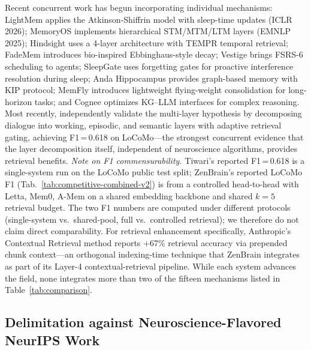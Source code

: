 \documentclass{article}
\begin{document}
Recent concurrent work has begun incorporating individual mechanisms:
LightMem \citep{liu2025lightmem} applies the Atkinson-Shiffrin model with
sleep-time updates (ICLR 2026);
MemoryOS \citep{xu2025memoryos} implements hierarchical STM/MTM/LTM layers
(EMNLP 2025);
Hindsight \citep{li2025hindsight} uses a 4-layer architecture with
TEMPR temporal retrieval;
FadeMem \citep{wang2026fadem} introduces bio-inspired Ebbinghaus-style decay;
Vestige \citep{vestige2026} brings FSRS-6 scheduling to agents;
SleepGate \citep{xie2026sleepgate} uses forgetting gates for
proactive interference resolution during sleep;
Anda Hippocampus \citep{anda2026hippocampus} provides graph-based
memory with KIP protocol;
MemFly \citep{memfly2026} introduces lightweight flying-weight consolidation
for long-horizon tasks;
and Cognee \citep{markovic2025cognee} optimizes KG--LLM interfaces
for complex reasoning.
Most recently, \citet{tiwari2026multilayered} independently validate the
multi-layer hypothesis by decomposing dialogue into working, episodic, and
semantic layers with adaptive retrieval gating, achieving F1\,=\,0.618 on
LoCoMo---the strongest concurrent evidence that the layer decomposition
itself, independent of neuroscience algorithms, provides retrieval benefits.
\emph{Note on F1 commensurability.} Tiwari's reported F1\,=\,0.618 is a
single-system run on the LoCoMo public test split; ZenBrain's reported
LoCoMo F1 (Tab.~\ref{tab:competitive-combined-v2}) is from a controlled
head-to-head with Letta, Mem0, A-Mem on a
shared embedding backbone and shared $k{=}5$ retrieval budget. The two
F1 numbers are computed under different protocols (single-system vs.\
shared-pool, full vs.\ controlled retrieval); we therefore do not claim
direct comparability.
For retrieval enhancement specifically, Anthropic's
Contextual Retrieval method \citep{anthropic2024contextual} reports
$+67\%$ retrieval accuracy via prepended chunk context---an orthogonal
indexing-time technique that ZenBrain integrates as part of its
Layer-4 contextual-retrieval pipeline.
While each system advances the field, none integrates more than two of
the fifteen mechanisms listed in Table~\ref{tab:comparison}.

\subsection{Delimitation against Neuroscience-Flavored NeurIPS Work}
\label{app:neurips-delimitation}
\end{document}
